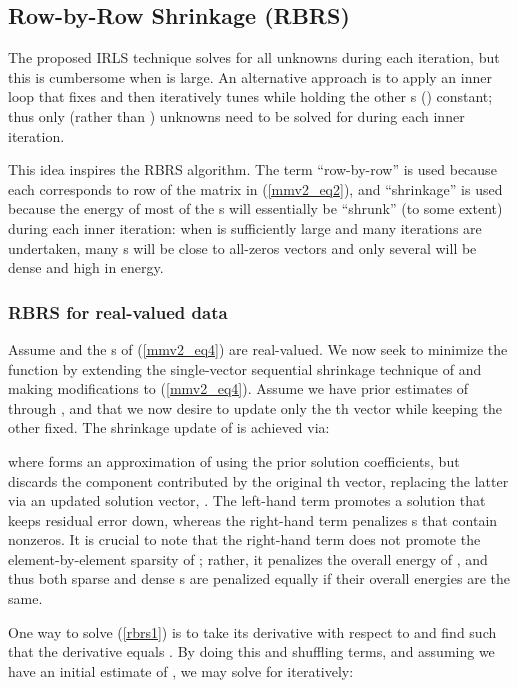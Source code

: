 \documentclass[final]{siamltex}
\newcommand{\la}[1]{\mbox{}}  \newcommand{\sst}[1]{\mbox{\scriptsize{#1}}}
\begin{document}
\subsection{Row-by-Row Shrinkage (RBRS)}

    The proposed IRLS technique solves for all  unknowns during
    each iteration, but this is cumbersome when  is large.  An
    alternative approach is to apply an inner loop that fixes  and
    then iteratively tunes  while holding the other
    s () constant; thus only  (rather than
    ) unknowns need to be solved for during each inner iteration.

    This idea inspires the RBRS algorithm.  The term ``row-by-row'' is
    used because each  corresponds to row  of the
     matrix in (\ref{mmv2_eq2}), and ``shrinkage'' is used
    because the  energy of most of the s will
    essentially be ``shrunk'' (to some extent) during each inner
    iteration: when  is sufficiently large and many
    iterations are undertaken, many s will be close to
    all-zeros vectors and only several will be dense and high in
    energy.

    \subsubsection{RBRS for real-valued data} Assume  and the
    s of (\ref{mmv2_eq4}) are real-valued.  We now seek to
    minimize the function by extending the single-vector sequential
    shrinkage technique of \cite{Ela2006_TransIT} and making
    modifications to (\ref{mmv2_eq4}).  Assume we have prior estimates
    of  through , and that we now desire to update
    only the th vector while keeping the other  fixed.  The
    shrinkage update of  is achieved via:
    
    where  forms
    an approximation of \la{d} using the prior solution coefficients,
    but discards the component contributed by the original th
    vector, replacing the latter via an updated solution vector,
    \la{x}.  The left-hand term promotes a solution \la{x} that keeps
    residual error down, whereas the right-hand term penalizes
    \la{x}s that contain nonzeros.  It is crucial to note that the
    right-hand term does not promote the element-by-element sparsity
    of \la{x}; rather, it penalizes the overall  energy of
    \la{x}, and thus both sparse and dense \la{x}s are penalized
    equally if their overall  energies are the same.

    One way to solve (\ref{rbrs1}) is to take its derivative with
    respect to  and find  such that the
    derivative equals .  By doing this and shuffling terms,
    and assuming we have an initial estimate of , we may solve
    for  iteratively:
    
\end{document}
